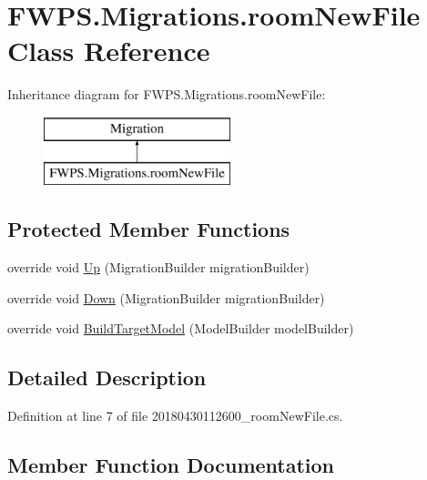 \hypertarget{class_f_w_p_s_1_1_migrations_1_1room_new_file}{}\section{F\+W\+P\+S.\+Migrations.\+room\+New\+File Class Reference}
\label{class_f_w_p_s_1_1_migrations_1_1room_new_file}
Inheritance diagram for F\+W\+P\+S.\+Migrations.\+room\+New\+File\+:\begin{figure}[H]
\begin{center}
\leavevmode
\includegraphics[height=2.000000cm]{class_f_w_p_s_1_1_migrations_1_1room_new_file}
\end{center}
\end{figure}
\subsection*{Protected Member Functions}
\begin{DoxyCompactItemize}
\item 
override void \mbox{\hyperlink{class_f_w_p_s_1_1_migrations_1_1room_new_file_a9f4f98fa3b3035a1cd6a6aeb844f115f}{Up}} (Migration\+Builder migration\+Builder)
\item 
override void \mbox{\hyperlink{class_f_w_p_s_1_1_migrations_1_1room_new_file_a524450e12c94c4d5377310d043c6c9b8}{Down}} (Migration\+Builder migration\+Builder)
\item 
override void \mbox{\hyperlink{class_f_w_p_s_1_1_migrations_1_1room_new_file_ae86aef9592431e9616fb17bb2ab2daa4}{Build\+Target\+Model}} (Model\+Builder model\+Builder)
\end{DoxyCompactItemize}


\subsection{Detailed Description}


Definition at line 7 of file 20180430112600\+\_\+room\+New\+File.\+cs.



\subsection{Member Function Documentation}
\mbox{\label{class_f_w_p_s_1_1_migrations_1_1room_new_file_ae86aef9592431e9616fb17bb2ab2daa4}} 
